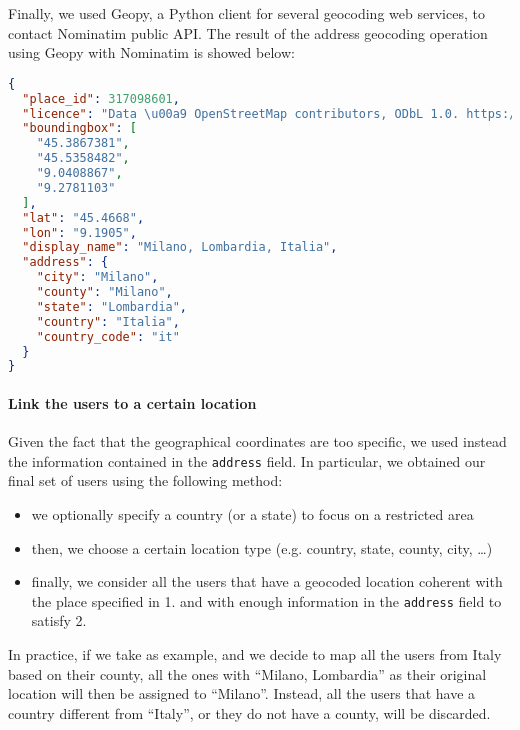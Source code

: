 Finally, we used Geopy, a Python client for several geocoding web services, to contact Nominatim public API. The result of the address geocoding operation using Geopy with Nominatim is showed below: 

\begin{lstlisting}[language=json, caption={Json object returned by Geopy given “Milano, Lombardia” as input}, captionpos=b, label={lst:nominatim-geocode}]
{
  "place_id": 317098601, 
  "licence": "Data \u00a9 OpenStreetMap contributors, ODbL 1.0. https://osm.org/copyright",
  "boundingbox": [
    "45.3867381", 
    "45.5358482", 
    "9.0408867", 
    "9.2781103"
  ], 
  "lat": "45.4668", 
  "lon": "9.1905", 
  "display_name": "Milano, Lombardia, Italia",
  "address": {
    "city": "Milano", 
    "county": "Milano",
    "state": "Lombardia", 
    "country": "Italia", 
    "country_code": "it"
  }
}
\end{lstlisting}

\paragraph{Link the users to a certain location}

Given the fact that the geographical coordinates are too specific, we used instead the information contained in the \texttt{address} field. In particular, we obtained our final set of users using the following method:
\begin{itemize}
	\item we optionally specify a country (or a state) to focus on a restricted area
	\item then, we choose a certain location type (e.g. country, state, county, city, \ldots)
	\item finally, we consider all the users that have a geocoded location coherent with the place specified in 1. and with enough information in the \texttt{address} field to satisfy 2.
\end{itemize}

In practice, if we take  as example, and we decide to map all the users from Italy based on their county, all the ones with “Milano, Lombardia” as their original location will then be assigned to “Milano”. Instead, all the users that have a country different from “Italy”, or they do not have a county, will be discarded.
